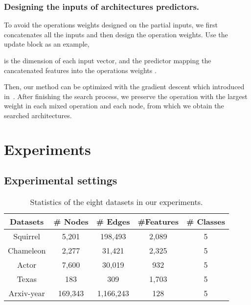\documentclass[sigconf]{acmart}
\begin{document}
\subsubsection{Designing the inputs of architectures predictors.}
To avoid the operations weights designed on the partial inputs, we first concatenates all the inputs and then design the operation weights.
Use the update block as an example, 

 is the dimension of each input vector, and the predictor  mapping the cancatenated features into the operations weights .

Then, our method can be optimized with the gradient descent which introduced in~\cite{liu2018darts,xie2018snas}. After finishing the search process, we preserve the operation with the largest weight in each mixed operation and each node, from which we obtain the searched architectures.












\section{Experiments}
\subsection{Experimental settings} 


\begin{table}[]
	\caption{Statistics of the eight datasets in our experiments.}
	\label{tb-statistic}
	\begin{tabular}{c|c|c|c|c}
		\hline
		Datasets       & \# Nodes  & \# Edges   & \#Features  & \# Classes\\ \hline
		Squirrel   & 5,201   & 198,493   & 2,089  & 5 \\ \hline
		Chameleon  & 2,277   & 31,421    & 2,325  & 5 \\ \hline
		Actor      & 7,600   & 30,019    & 932    & 5 \\ \hline
		Texas      & 183     & 309       & 1,703  & 5 \\ \hline
Arxiv-year & 169,343 & 1,166,243 & 128    & 5 \\ \hline
	\end{tabular}
\end{table} 
\end{document}

